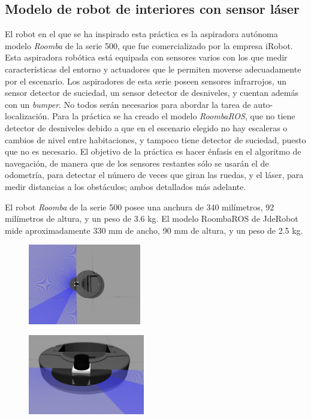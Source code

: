 \subsection{Modelo de robot de interiores con sensor láser}
El robot en el que se ha inspirado esta práctica es la aspiradora autónoma modelo \textit{Roomba} de la serie 500, que fue comercializado por la empresa iRobot. Esta aspiradora robótica está equipada con sensores varios con los que medir características del entorno y actuadores que le permiten moverse adecuadamente por el escenario. Los aspiradores de esta serie poseen sensores infrarrojos, un sensor detector de suciedad, un sensor detector de desniveles, y cuentan además con un \textit{bumper}. No todos serán necesarios para abordar la tarea de auto-localización. Para la práctica se ha creado el modelo \textit{RoombaROS}, que no tiene detector de desniveles debido a que en el escenario elegido no hay escaleras o cambios de nivel entre habitaciones, y tampoco tiene detector de suciedad, puesto que no es necesario. El objetivo de la práctica es hacer énfasis en el algoritmo de navegación, de manera que de los sensores restantes sólo se usarán el de odometría, para detectar el número de veces que giran las ruedas, y el láser, para medir distancias a los obstáculos; ambos detallados más adelante. 

El robot \textit{Roomba} de la serie 500 posee una anchura de 340 milímetros, 92 milímetros de altura, y un peso de 3.6 kg. El modelo RoombaROS de JdeRobot mide aproximadamente 330 mm de ancho, 90 mm de altura, y un peso de 2.5 kg.

\begin{figure}[h]
	\centering
	\begin{minipage}[h]{.48\linewidth}
		\centering
		\includegraphics[width=.7\linewidth, height=3.5cm]{figures/create.png}
		\label{fig:roombaROS}
	\end{minipage}
	\begin{minipage}[h]{.48\linewidth}
		\centering
		\includegraphics[width=.7\linewidth, height=3.5cm]{figures/hokuyo.png}
		\label{fig:hokuyo}
	\end{minipage}
\end{figure}

